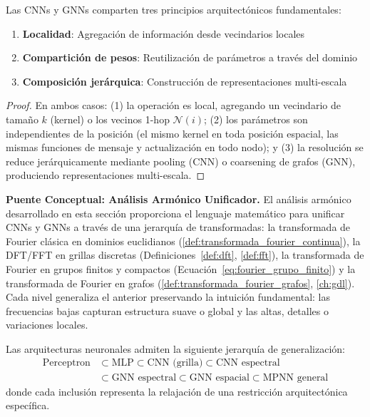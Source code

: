 \begin{proposition}\label{prop:principios_compartidos}
Las \glspl{CNN} y \glspl{GNN} comparten tres principios arquitectónicos fundamentales:
\begin{enumerate}
    \item \textbf{Localidad}: Agregación de información desde vecindarios locales
    \item \textbf{Compartición de pesos}: Reutilización de parámetros a través del dominio
    \item \textbf{Composición jerárquica}: Construcción de representaciones multi-escala
\end{enumerate}
\end{proposition}

\begin{proof}
En ambos casos: (1) la operación es local, agregando un vecindario de tamaño $k$ (kernel) o los vecinos 1-hop $\mathcal{N}(i)$; (2) los parámetros son independientes de la posición (el mismo kernel en toda posición espacial, las mismas funciones de mensaje y actualización en todo nodo); y (3) la resolución se reduce jerárquicamente mediante pooling (CNN) o coarsening de grafos (GNN), produciendo representaciones multi-escala.
\end{proof}

\textbf{Puente Conceptual: Análisis Armónico Unificador.} El análisis armónico desarrollado en esta sección proporciona el lenguaje matemático para unificar CNNs y GNNs a través de una jerarquía de transformadas: la transformada de Fourier clásica en dominios euclidianos (\autoref{def:transformada_fourier_continua}), la DFT/FFT en grillas discretas (Definiciones~\ref{def:dft}, \ref{def:fft}), la transformada de Fourier en grupos finitos y compactos (Ecuación~\ref{eq:fourier_grupo_finito}) y la transformada de Fourier en grafos (\autoref{def:transformada_fourier_grafos}, \autoref{ch:gdl}). Cada nivel generaliza el anterior preservando la intuición fundamental: las frecuencias bajas capturan estructura suave o global y las altas, detalles o variaciones locales.

\begin{theorem}\label{thm:jerarquia_generalizacion_cnn}
Las arquitecturas neuronales admiten la siguiente jerarquía de generalización:
\begin{align}
\text{Perceptron} &\subset \text{MLP} \subset \text{CNN (grilla)} \subset \text{CNN espectral} \nonumber \\
&\subset \text{GNN espectral} \subset \text{GNN espacial} \subset \text{MPNN general}
\end{align}
donde cada inclusión representa la relajación de una restricción arquitectónica específica.
\end{theorem}

